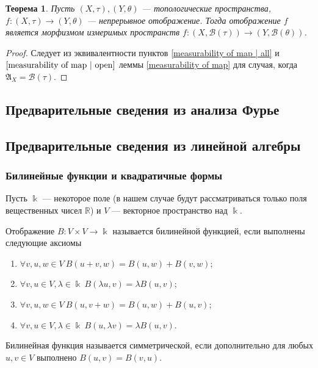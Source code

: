 \documentclass[12pt]{article}
\newtheorem{theorem}{Теорема}
\numberwithin{theorem}{section}
\theoremstyle{definition}
\newcommand{\defin}[2]{\hypertarget{#2}{{\color{red} #1}}}
\newcommand{\RR}{\mathbb{R}}
\newcommand{\setsigmaalg}{\mathfrak{A}}
\newcommand{\calB}{\mathcal{B}}
\begin{document}
	\begin{theorem} \label{borel functor}
		Пусть $ (X, \tau), (Y, \theta) $ --- топологические пространства,
		$ f \colon (X, \tau) \to (Y, \theta) $ --- непрерывное отображение.
		Тогда отображение $ f $ является морфизмом измеримых пространств
		$ f \colon (X, \calB(\tau)) \to (Y, \calB(\theta)) $.
	\end{theorem}
	
	\begin{proof}
		Следует из эквивалентности пунктов \ref{measurability of map | all}
		и $ \ref{measurability of map | open} $ леммы \ref{measurability of map} 
		для случая, когда $ \setsigmaalg_X = \calB(\tau) $.
	\end{proof}
	
	\subsection{Предварительные сведения из анализа Фурье}
	
	\subsection{Предварительные сведения из линейной алгебры}
	
	\subsubsection{Билинейные функции и квадратичные формы}
	
	Пусть $ \Bbbk $ --- некоторое поле (в нашем случае будут рассматриваться только поля вещественных чисел $ \RR $) и $ V $ --- векторное пространство над $ \Bbbk $.
	
	Отображение $ B \colon V \times V \to \Bbbk $ называется \defin{билинейной функцией}{bilinear}, если выполнены следующие аксиомы
	\begin{enumerate}
		\item $ \forall v,u,w \in V \ B(u + v, w) = B(u, w) + B(v, w) $;
		\item $ \forall v,u \in V, \lambda \in \Bbbk \ B(\lambda u, v) = \lambda B(u, v) $;
		\item $ \forall v,u,w \in V \ B(u, v + w) = B(u, w) + B(u, v) $;
		\item $ \forall v,u \in V, \lambda \in \Bbbk \ B(u, \lambda v) = \lambda B(u, v) $.
	\end{enumerate}
	
	Билинейная функция называется \defin{симметрической}{symmetric}, если дополнительно для любых $ u, v \in V $ выполнено $ B(u, v) = B(v, u) $.
	
\end{document}
